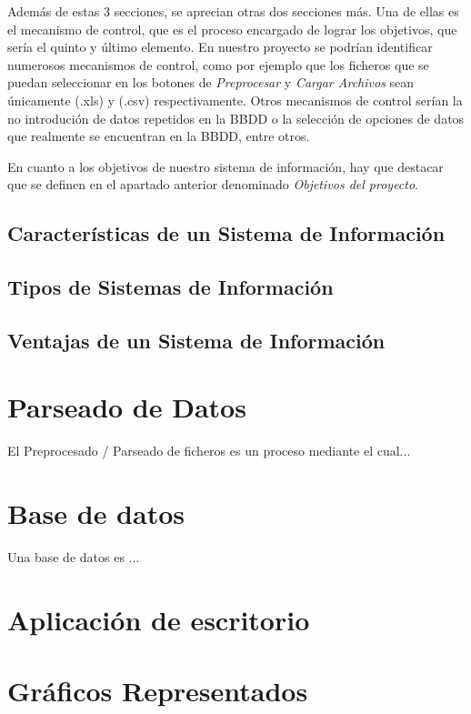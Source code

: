 Además de estas 3 secciones, se aprecian otras dos secciones más. Una de ellas es el mecanismo de control, que es el proceso encargado de lograr los objetivos, que sería el quinto y último elemento.
En nuestro proyecto se podrían identificar numerosos mecanismos de control, como por ejemplo que los ficheros que se puedan seleccionar en los botones de \emph{Preprocesar} y \emph{Cargar Archivos} sean únicamente (.xls) y (.csv) respectivamente. Otros mecanismos de control serían la no introdución de datos repetidos en la BBDD o la selección de opciones de datos que realmente se encuentran en la BBDD, entre otros.

En cuanto a los objetivos de nuestro sistema de información, hay que destacar que se definen en el apartado anterior denominado \emph{Objetivos del proyecto}.

\subsection{Características de un Sistema de Información}



\subsection{Tipos de Sistemas de Información}



\subsection{Ventajas de un Sistema de Información}



\section{Parseado de Datos}
El Preprocesado / Parseado de ficheros es un proceso mediante el cual...




\section{Base de datos}
Una base de datos es ...

\section{Aplicación de escritorio}

\section{Gráficos Representados}


